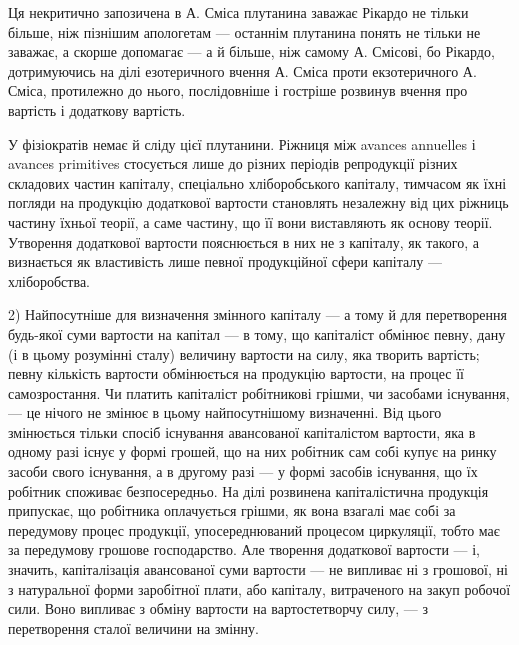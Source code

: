 Ця некритично запозичена в А. Сміса плутанина заважає Рікардо
не тільки більше, ніж пізнішим апологетам — останнім плутанина понять
не тільки не заважає, а скорше допомагає — а й більше, ніж самому
А. Смісові, бо Рікардо, дотримуючись на ділі езотеричного вчення
А. Сміса проти екзотеричного А. Сміса, протилежно до нього, послідовніше
і гостріше розвинув вчення про вартість і додаткову вартість.

У фізіократів немає й сліду цієї плутанини. Ріжниця між avances
annuelles і avances primitives стосується лише до різних періодів репродукції
різних складових частин капіталу, спеціально хліборобського капіталу,
тимчасом як їхні погляди на продукцію додаткової вартости становлять
незалежну від цих ріжниць частину їхньої теорії, а саме частину,
що її вони виставляють як основу теорії. Утворення додаткової вартости
пояснюється в них не з капіталу, як такого, а визнається як властивість
лише певної продукційної сфери капіталу — хліборобства.

2) Найпосутніше для визначення змінного капіталу — а тому й для
перетворення будь-якої суми вартости на капітал — в тому, що капіталіст
обмінює певну, дану (і в цьому розумінні сталу) величину вартости на
силу, яка творить вартість; певну кількість вартости обмінюється на продукцію
вартости, на процес її самозростання. Чи платить капіталіст робітникові
грішми, чи засобами існування, — це нічого не змінює в цьому
найпосутнішому визначенні. Від цього змінюється тільки спосіб існування
авансованої капіталістом вартости, яка в одному разі існує у формі грошей,
що на них робітник сам собі купує на ринку засоби свого існування,
а в другому разі — у формі засобів існування, що їх робітник
споживає безпосередньо. На ділі розвинена капіталістична продукція
припускає, що робітника оплачується грішми, як вона взагалі має собі
за передумову процес продукції, упосереднюваний процесом циркуляції,
тобто має за передумову грошове господарство. Але творення додаткової
вартости — і, значить, капіталізація авансованої суми вартости — не випливає
ні з грошової, ні з натуральної форми заробітної плати, або капіталу,
витраченого на закуп робочої сили. Воно випливає з обміну вартости
на вартостетворчу силу, — з перетворення сталої величини на змінну.

